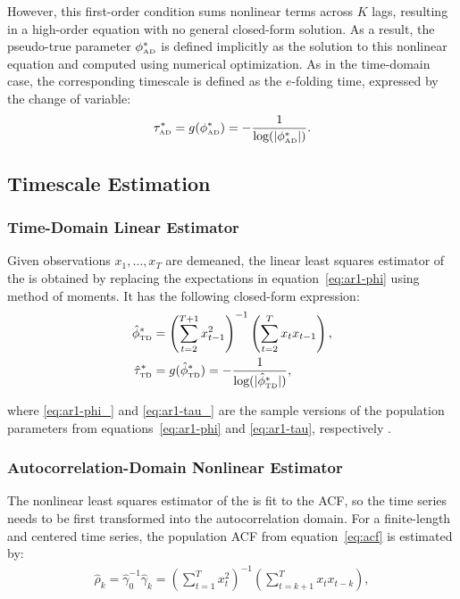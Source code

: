 \documentclass[docs/main.tex]{subfiles}
\begin{document}
\noindent However, this first-order condition sums nonlinear terms across $K$ lags, resulting in a high-order equation with no general closed-form solution. As a result, the pseudo-true parameter $\phi_{\scriptscriptstyle\text{AD}}^*$ is defined implicitly as the solution to this nonlinear equation and computed using numerical optimization. As in the time-domain case, the corresponding timescale is defined as the $e$-folding time, expressed by the change of variable:
\begin{align}
    \tau_{\scriptscriptstyle\text{AD}}^* = g(\phi_{\scriptscriptstyle\text{AD}}^*) = -\frac{1}{\text{log}(|\phi_{\scriptscriptstyle\text{AD}}^*|)}. \label{eq:nlm-tau}
\end{align}

\subsection{Timescale Estimation}\label{sec:timescale-estimation}
\subsubsection{Time-Domain Linear Estimator}\label{sec:time-domain-linear-estimator}
Given observations $x_1, \dots, x_T$ are demeaned, the linear least squares estimator of the  is obtained by replacing the expectations in equation~\eqref{eq:ar1-phi} using method of moments. It has the following closed-form expression:
\begin{align}
    \hat{\phi}^*_{\scriptscriptstyle\text{TD}} &= \left(\sum_{t=2}^{T+1} x_{t-1}^2\right)^{-1} \left(\sum_{t=2}^T x_t x_{t-1}\right),\label{eq:ar1-phi_}\\
    \hat{\tau}^*_{\scriptscriptstyle\text{TD}} &= g(\hat{\phi}^*_{\scriptscriptstyle\text{TD}}) = -\frac{1}{\text{log}(|\hat{\phi}^*_{\scriptscriptstyle\text{TD}}|)},\label{eq:ar1-tau_}
\end{align}

\noindent where \eqref{eq:ar1-phi_} and \eqref{eq:ar1-tau_} are the sample versions of the population parameters from equations~\eqref{eq:ar1-phi} and \eqref{eq:ar1-tau}, respectively \citep[Chapter~14.3]{hansen_econometrics_2022}.\\


\subsubsection{Autocorrelation-Domain Nonlinear Estimator}\label{sec:autocorrelation-domain-nonlinear-estimator}
The nonlinear least squares estimator of the  is fit to the ACF, so the time series needs to be first transformed into the autocorrelation domain. For a finite-length and centered time series, the population ACF from equation~\eqref{eq:acf} is estimated by:
\begin{align}\label{eq:acf_}
    \hat\rho_k = \hat\gamma_0^{-1}\hat\gamma_k = \left(\sum_{t=1}^T x_t^2\right)^{-1} \left(\sum_{t=k+1}^{T}x_t x_{t-k}\right),
\end{align}
\end{document}
